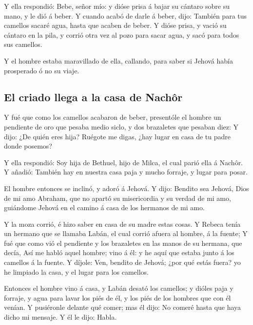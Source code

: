 Y ella respondió: Bebe, señor mío: y dióse prisa á bajar
su cántaro sobre su mano, y le dió á beber.  Y cuando
acabó de darle á beber, dijo: También para tus camellos sacaré agua,
hasta que acaben de beber.  Y dióse prisa, y vació su
cántaro en la pila, y corrió otra vez al pozo para sacar agua, y sacó
para todos sus camellos.

 Y el hombre estaba maravillado de ella, callando, para
saber si Jehová había prosperado ó no su viaje.

\hypertarget{el-criado-llega-a-la-casa-de-nachuxf4r}{%
\subsection{El criado llega a la casa de
Nachôr}\label{el-criado-llega-a-la-casa-de-nachuxf4r}}

 Y fué que como los camellos acabaron de beber,
presentóle el hombre un pendiente de oro que pesaba medio siclo, y dos
brazaletes que pesaban diez:  Y dijo: ¿De quién eres
hija? Ruégote me digas, ¿hay lugar en casa de tu padre donde posemos?

 Y ella respondió: Soy hija de Bethuel, hijo de Milca, el
cual parió ella á Nachôr.  Y añadió: También hay en
nuestra casa paja y mucho forraje, y lugar para posar.

 El hombre entonces se inclinó, y adoró á Jehová.
 Y dijo: Bendito sea Jehová, Dios de mi amo Abraham, que
no apartó su misericordia y su verdad de mi amo, guiándome Jehová en el
camino á casa de los hermanos de mi amo.

 Y la moza corrió, é hizo saber en casa de su madre estas
cosas.  Y Rebeca tenía un hermano que se llamaba Labán,
el cual corrió afuera al hombre, á la fuente;  Y fué que
como vió el pendiente y los brazaletes en las manos de su hermana, que
decía, Así me habló aquel hombre; vino á él: y he aquí que estaba junto
á los camellos á la fuente.  Y díjole: Ven, bendito de
Jehová; ¿por qué estás fuera? yo he limpiado la casa, y el lugar para
los camellos.

 Entonces el hombre vino á casa, y Labán desató los
camellos; y dióles paja y forraje, y agua para lavar los piés de él, y
los piés de los hombres que con él venían.  Y pusiéronle
delante qué comer; mas él dijo: No comeré hasta que haya dicho mi
mensaje. Y él le dijo: Habla.

